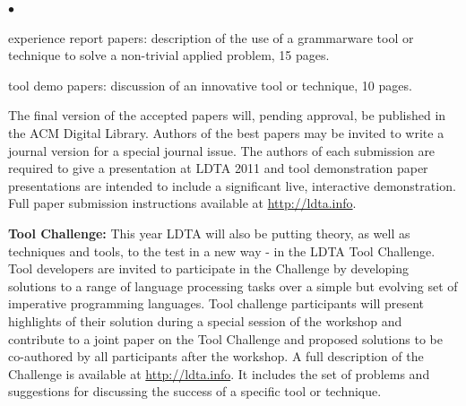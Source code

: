 \documentclass[10pt]{article}
\newenvironment{inditemlist}{
                         \begin{list}{{$\bullet$}} 
                         {\setlength{\itemsep}{0pt} 
                         \setlength{\topsep}{0pt} 
                         \setlength{\partopsep}{2pt}
                         \setlength{\leftmargin}{12pt} 
                         \setlength{\labelwidth}{8pt} 
                         \setlength{\labelsep}{2pt} 
                         \setlength{\listparindent}{0pt}
                         \setlength{\parsep}{0.07cm}
                         \usecounter{enumi} 
                         \setlength{\parskip}{0.2cm}}}{\end{list}\vspace{2mm} }
\begin{document}
\begin{minipage}[t]{5.1in}
\begin{inditemlist}
\item experience report papers: description of the use of a grammarware
  tool or technique to solve a non-trivial applied problem, 15 pages.

\item tool demo papers: discussion of an innovative tool or technique,
  10 pages.
\end{inditemlist}
The final version of the accepted papers will,
pending approval, be published in the ACM Digital Library.  Authors of
the best papers may be invited to write a journal version for a
special journal issue.
%
The authors of each submission are required to give a presentation at
LDTA 2011 and tool demonstration paper presentations are intended to
include a significant live, interactive demonstration.
%
Full paper submission instructions available at \url{http://ldta.info}.

\medskip
\textbf{Tool Challenge:}
This year LDTA will also be putting theory, as well as techniques and
tools, to the test in a new way - in the LDTA Tool Challenge.  Tool
developers are invited to participate in the Challenge by developing
solutions to a range of language processing tasks over a simple but
evolving set of imperative programming languages.  Tool challenge
participants will present highlights of their solution during a
special session of the workshop and contribute to a joint paper on the
Tool Challenge and proposed solutions to be co-authored by all
participants after the workshop.  
%
A full description of the Challenge is available at
\url{http://ldta.info}.  It includes the set of
problems and suggestions for discussing the success of a specific
tool or technique.






\end{minipage}
\end{document}
